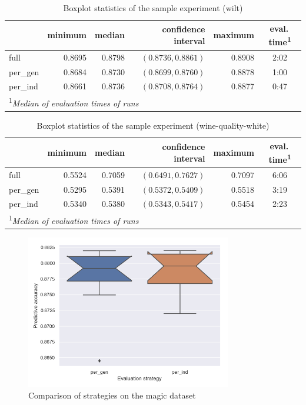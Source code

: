 \begin{table}[ht]
\centering
\caption{Boxplot statistics of the sample experiment (wilt)}\label{tab04:exp1:wboxstats}

\begin{tabular}{lrrrr|c}
\toprule
{} &  minimum & median & confidence interval &  maximum & eval.\,time\textsuperscript{1} \\
\midrule
full     &   0.8695 &  0.8798 &   $(0.8736,0.8861)$ &   0.8908 & 2:02 \\
per\_gen &   0.8684 &  0.8730 &   $(0.8699,0.8760)$ &   0.8878 & 1:00 \\
per\_ind &   0.8661 &  0.8736 &   $(0.8708,0.8764)$ &   0.8877 & 0:47 \\
\bottomrule

\multicolumn{6}{l}{\footnotesize\textsuperscript{1}\itshape Median of evaluation times of runs}

\end{tabular}

\end{table}

\begin{table}[ht]
\centering
\caption{Boxplot statistics of the sample experiment (wine-quality-white)}\label{tab04:exp1:wineboxstats}

\begin{tabular}{lrrrr|c}
\toprule
{} &  minimum &  median & confidence interval &  maximum & eval.\,time\textsuperscript{1} \\
\midrule
full     &   0.5524 &  0.7059 &   $(0.6491,0.7627)$ &   0.7097 & 6:06 \\
per\_gen &   0.5295 &  0.5391 &   $(0.5372,0.5409)$ &   0.5518 & 3:19 \\
per\_ind &   0.5340 &  0.5380 &   $(0.5343,0.5417)$ &   0.5454 & 2:23 \\
\bottomrule

\multicolumn{6}{l}{\footnotesize\textsuperscript{1}\itshape Median of evaluation times of runs}

\end{tabular}

\end{table}

\begin{figure}[b!]\centering
\includegraphics[width=0.8\textwidth]{../img/magic-out.png}
\caption{Comparison of strategies on the magic dataset}
\label{pic04:magic}
\end{figure}

